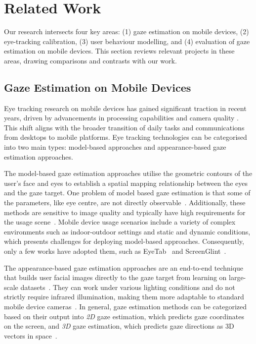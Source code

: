 \section{Related Work}\label{sec:relatedwork}

Our research intersects four key areas: (1) gaze estimation on mobile devices, (2) eye-tracking calibration, (3) user behaviour modelling, and (4) evaluation of gaze estimation on mobile devices. This section reviews relevant projects in these areas, drawing comparisons and contrasts with our work.


\subsection{Gaze Estimation on Mobile Devices}

Eye tracking research on mobile devices has gained significant traction in recent years, driven by advancements in processing capabilities and camera quality \cite{khamis2018past, cheng2024benchmark, lei2023end, ghosh2023automatic}. This shift aligns with the broader transition of daily tasks and communications from desktops to mobile platforms. Eye tracking technologies can be categorised into two main types: model-based approaches and appearance-based gaze estimation approaches. 


The model-based gaze estimation approaches utilise the geometric contours of the user's face and eyes to establish a spatial mapping relationship between the eyes and the gaze target. One problem of model based gaze estimation is that some of the parameters, like eye centre, are not directly observable~\cite{hansen2009eye, kaur2022rethinking}.  Additionally, these methods are sensitive to image quality and typically have high requirements for the usage scene~\cite{hansen2009eye, liu20203d}. Mobile device usage scenarios include a variety of complex environments such as indoor-outdoor settings and static and dynamic conditions, which presents challenges for deploying model-based approaches. Consequently, only a few works have adopted them, such as EyeTab~\cite{wood2014eyetab} and ScreenGlint~\cite{huang2017screenglint}. 

The appearance-based gaze estimation approaches are an end-to-end technique that builds user facial images directly to the gaze target from learning on large-scale datasets~\cite{zhang2015appearance, zhang2017fullface}. They can work under various lighting conditions and do not strictly require infrared illumination, making them more adaptable to standard mobile device cameras~\cite{zhang2015appearance, krafka2016eye}. In general, gaze estimation methods can be categorized based on their output into \textit{2D} gaze estimation, which predicts gaze coordinates on the screen, and \textit{3D} gaze estimation, which predicts gaze directions as 3D vectors in space~\cite{sugano2014learning, cheng2024benchmark}.

